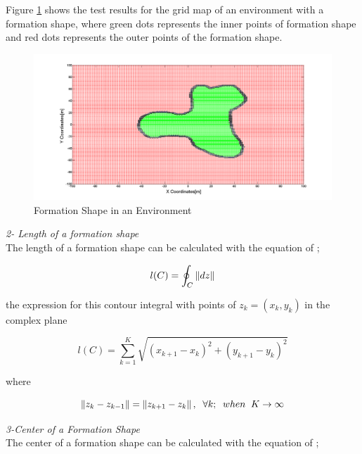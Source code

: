 Figure \ref{iceride_disarida_refe} shows the test results for the grid map of an environment with a formation shape, where green dots represents the inner points of formation shape and red dots represents the outer points of the formation shape.

\begin{figure}[H]
\centering
\captionsetup{format=hang,justification=centerfirst}
\caption{Formation Shape in an Environment} \label{iceride_disarida_refe}
\includegraphics[scale = 0.28]{iceride_disarida}
\end{figure}

\textit{ 	2- Length of a formation shape} \\ 
The length of a formation shape can be calculated with the equation of \cite{17};
		
\begin{equation}
l(C)= \oint_C \left\lVert dz\right\rVert
\end{equation}
		
the expression for this contour integral with points of   $z_k = (x_k,y_k)$ in the complex plane

\begin{equation}
l(C) = \sum_{k=1}^{K}\sqrt{(x_{k+1} - x_k)^2 + (y_{k+1} - y_k)^2}
\end{equation}

where

\begin{equation}
\left\lVert z_k - z_{k-1}\right\rVert = \left\lVert z_{k+1} - z_k\right\rVert, \hspace{0.2cm}  \forall k ;  \hspace{0.2cm} when  \hspace{0.2cm} K \to\infty
\end{equation}
		
\textit{ 	3-Center of a Formation Shape} \\ 	
The center of a formation shape can be calculated with the equation of \cite{17};

